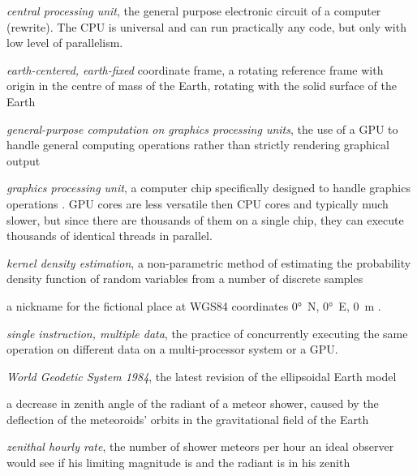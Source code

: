 \begin{description}[leftmargin=40mm]
    \item[CPU]
        \emph{central processing unit}, the general purpose electronic circuit of a computer \cite{...} (rewrite).
        The CPU is universal and can run practically any code, but only with low level of parallelism.
    \item[ECEF]
        \emph{earth-centered, earth-fixed} coordinate frame, a rotating reference frame with origin
        in the centre of mass of the Earth, rotating with the solid surface of the Earth \citep{ecef}
    \item[GPGPU]
        \emph{general-purpose computation on graphics processing units},
        the use of a GPU to handle general computing operations rather than strictly rendering graphical output \citep{techterms}
    \item[GPU]
        \emph{graphics processing unit}, a computer chip specifically designed to handle graphics operations \citep{techterms}.
        GPU cores are less versatile then CPU cores and typically much slower, but since there are thousands of them on a single
        chip, they can execute thousands of identical threads in parallel.
    \item[KDE]
        \emph{kernel density estimation}, a non-parametric method of estimating the probability density function
        of random variables from a number of discrete samples \citep{kde}
    \item[Null Island]
        a nickname for the fictional place at WGS84 coordinates \ang{0}~N, \ang{0}~E, \SI{0}{\metre} \citep{null-island}.
    \item[SIMD]
        \emph{single instruction, multiple data}, the practice of concurrently executing the same operation on
        different data on a multi-processor system or a GPU.
    \item[WGS84]
        \emph{World Geodetic System 1984}, the latest revision of the ellipsoidal Earth model \citep{nima-wgs84}
    \item[zenith attraction]
        a decrease in zenith angle of the radiant of a meteor shower, caused by the deflection of the meteoroids' orbits in the
        gravitational field of the Earth \citep{lovell1954}
    \item[ZHR]
        \emph{zenithal hourly rate}, the number of shower meteors per hour an ideal observer would see
            if his limiting magnitude is  and the radiant is in his zenith \citep{imo-glossary}
\end{description}
